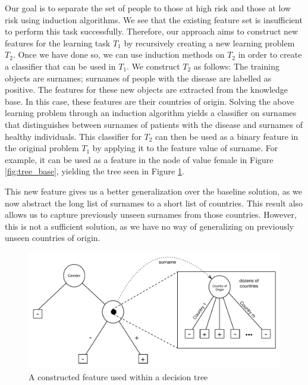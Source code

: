 \documentclass{article}
\theoremstyle{definition}
\begin{document}
Our goal is to separate the set of people to those at high risk and those at low risk using induction algorithms. We see that the existing feature set is insufficient to perform this task successfully. Therefore, our approach aims to construct new features for the learning task $T_1$ by recursively creating a new learning problem $T_2$. Once we have done so, we can use induction methods on $T_2$ in order to create a classifier that can be used in $T_1$. We construct $T_2$ as follows: 
The training objects are surnames; surnames of people with the disease are labelled as positive. The features for these new objects are extracted from the knowledge base. In this case, these features are their countries of origin.
Solving the above learning problem through an induction algorithm yields a classifier on surnames that distinguishes between surnames of patients with the disease and surnames of healthy individuals. This classifier for $T_2$ can then be used as a binary feature in the original problem $T_1$ by applying it to the feature value of surname. For example, it can be used as a feature in the node of value female in Figure \ref{fig:tree_base}, yielding the tree seen in Figure \ref{fig:lvl1_tree}. 

This new feature gives us a better generalization over the baseline solution, as we now abstract the long list of surnames to a short list of countries. %
This result also allows us to capture previously unseen surnames from those countries. However, this is not a sufficient solution, as we have no way of generalizing on previously unseen countries of origin. %


\begin{figure}[h]
	\centering
	\includegraphics[width=\linewidth]{fig2.pdf}
	\caption{A constructed feature used within a decision tree}
	\label{fig:lvl1_tree}
\end{figure}
\end{document}
